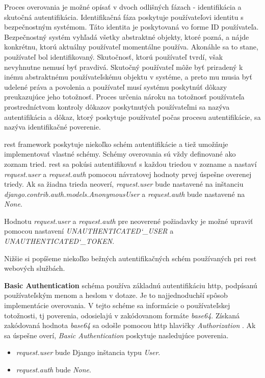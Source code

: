 Proces overovania je možné opísať v dvoch odlišných fázach - identifikácia a skutočná autentifikácia.
Identifikačná fáza poskytuje používateľovi identitu s bezpečnostným systémom. Táto identita
je poskytovaná vo forme ID používateľa. Bezpečnostný systém vyhľadá všetky abstraktné
objekty, ktoré pozná, a nájde konkrétnu, ktorú aktuálny používateľ momentálne používa.
Akonáhle sa to stane, používateľ bol identifikovaný. Skutočnosť, ktorú používateľ tvrdí, však
nevyhnutne nemusí byť pravdivá. Skutočný používateľ môže byť priradený k inému abstraktnému
používateľskému objektu v systéme, a preto mu musia byť udelené práva a povolenia a používateľ
musí systému poskytnúť dôkazy preukazujúce jeho totožnosť. Proces určenia nároku na totožnosť
používateľa prostredníctvom kontroly dôkazov poskytnutých používateľmi sa nazýva autentifikácia
a dôkaz, ktorý poskytuje používateľ počas procesu autentifikácie, sa nazýva identifikačné poverenie.

\acrshort{rest} framework poskytuje niekoľko schém autentifikácie a tiež umožňuje implementovať vlastné
schémy. Schémy overovania sú vždy definované ako zoznam tried. \acrshort{rest} sa pokúsi autentifikovať
s každou triedou v zozname a nastaví \textit{request.user} a \textit{request.auth} pomocou
návratovej hodnoty prvej úspešne overenej triedy. Ak sa žiadna trieda neoverí, \textit{request.user}
bude nastavené na inštanciu \textit{django.contrib.auth.models.AnonymousUser}
a \textit{request.auth} bude nastavené na \textit{None}.

Hodnotu \textit{request.user} a \textit{request.auth} pre neoverené požiadavky je možné upraviť
pomocou nastavení \textit{UNAUTHENTICATED\char`_USER} a \textit{UNAUTHENTICATED\char`_TOKEN}.

Nižšie si popíšeme niekoľko bežných autentifikačných schém používaných pri \acrshort{rest} webových službách.

\vskip 0.5cm
\textbf{Basic Authentication} schéma používa základnú autentifikáciu \acrshort{http}, podpísanú používateľským
menom a heslom v dotaze. Je to najjednoduchší spôsob implementácie overovania. V tejto schéme
sa informácie o používateľskej totožnosti, tj poverenia, odosielajú v zakódovanom formáte \textit{base64}.
Získaná zakódovaná hodnota \textit{base64} sa odošle pomocou \acrshort{http} hlavičky \textit{Authorization} \cite{rfc7617}.
Ak sa úspešne overí, \textit{Basic Authentication} poskytuje nasledujúce poverenia.
\begin{itemize}
\item \textit{request.user} bude Django inštancia typu \textit{User}.
\item \textit{request.auth} bude \textit{None}.
\end{itemize}

